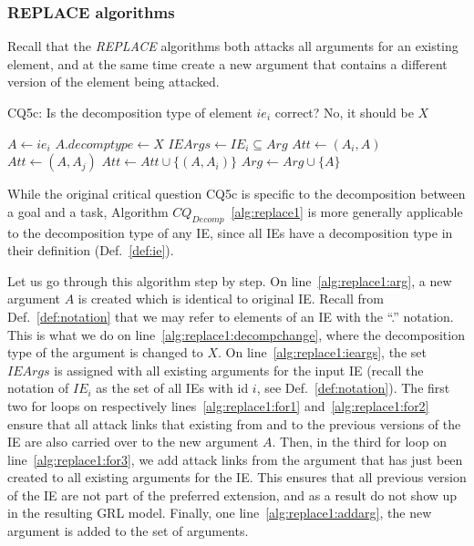 \subsubsection{REPLACE algorithms}

Recall that the \emph{REPLACE} algorithms both attacks all arguments for an existing element, and at the same time create a new argument that contains a different version of the element being attacked.

\begin{algorithm}[h]
  \caption{CQ5c: Is the decomposition type of element $ie_i$ correct? No, it should be $X$ }\label{alg:replace1}
  \begin{algorithmic}[1]
    \State $A \leftarrow ie_i$\label{alg:replace1:arg}
    \State $A.decomptype\leftarrow X$\label{alg:replace1:decompchange}
    \State $IEArgs\leftarrow IE_i\subseteq  Arg$\label{alg:replace1:ieargs}
    \label{alg:replace1:for1}
      \State $Att\leftarrow (A_i,A)$
    \EndFor
    \label{alg:replace1:for2}
      \State $Att\leftarrow (A,A_j)$
    \label{alg:replace1:for3}
      \State $Att \leftarrow Att \cup \{(A,A_i)\}$\label{alg:replace1:att}
    \EndFor
    \EndFor
    \State $Arg\leftarrow Arg \cup \{A\}$\label{alg:replace1:addarg}
    \EndProcedure
  \end{algorithmic}
\end{algorithm}

While the original critical question CQ5c is specific to the decomposition between a goal and a task, Algorithm $CQ_{Decomp}$~\ref{alg:replace1} is more generally applicable to the decomposition type of any IE, since all IEs have a decomposition type in their definition (Def.~\ref{def:ie}). 

Let us go through this algorithm step by step. On line~\ref{alg:replace1:arg}, a new argument $A$ is created which is identical to original IE. Recall from Def.~\ref{def:notation} that we may refer to elements of an IE with the ``.'' notation. This is what we do on line~\ref{alg:replace1:decompchange}, where the decomposition type of the argument is changed to $X$. On line~\ref{alg:replace1:ieargs}, the set $IEArgs$ is assigned with all existing arguments for the input IE (recall the notation of $IE_i$ as the set of all IEs with id $i$, see Def.~\ref{def:notation}). The first two for loops on respectively lines~\ref{alg:replace1:for1} and~\ref{alg:replace1:for2} ensure that all attack links that existing from and to the previous versions of the IE are also carried over to the new argument $A$. Then, in the third for loop on line~\ref{alg:replace1:for3}, we add attack links from the argument that has just been created to all existing arguments for the IE. This ensures that all previous version of the IE are not part of the preferred extension, and as a result do not show up in the resulting GRL model. Finally, one line~\ref{alg:replace1:addarg}, the new argument is added to the set of arguments.

